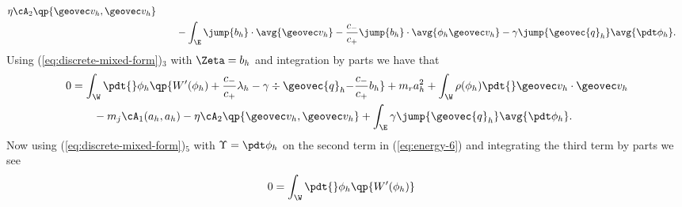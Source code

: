 \documentclass[final]{amsart}
\numberwithin{equation}{section}
\begin{document}
\begin{Proof}
\begin{equation}
\begin{split}
      \eta\cA_2\qp{{\geovec v_h},{\geovec v_h}}
      \\
      &\qquad
      -
      \int_\E
      \jump{b_h} \cdot \avg{\geovec v_h}
      -
      \frac{c_-}{c_+}\jump{b_h} \cdot \avg{\phi_h \geovec v_h}
      -
      \gamma\jump{{\geovec{q}}_h} \avg{\pdt \phi_h}.
    \end{split}
  \end{equation}
  Using (\ref{eq:discrete-mixed-form})$_3$ with $\Zeta = b_h$ and integration by parts we have
  that
\begin{equation}
    \label{eq:energy-6}
    \begin{split}
      0
      &= 
      \int_\W \pdt{}\phi_h 
      \qp{ W'(\phi_h) 
        +
        \frac{c_-}{c_+} \lambda_h 
        -
        \gamma \div{{\geovec{q}}_h}
        {-}
        \frac{c_-}{c_+} b_h
      }
      +
      m_r a_h^2
      +
      \int_\W
      \rho(\phi_h) \pdt{}\geovec v_h \cdot \geovec v_h
      \\
      &\qquad 
      - 
      m_j \cA_1(a_h,a_h) 
      -
      \eta\cA_2\qp{{\geovec v_h},{\geovec v_h}}
      +
      \int_\E
      \gamma\jump{{\geovec{q}}_h} \avg{\pdt \phi_h}.
    \end{split}
  \end{equation}
  Now using (\ref{eq:discrete-mixed-form})$_5$ with $\Upsilon = \pdt
  \phi_h$ on the second term in (\ref{eq:energy-6}) and integrating
  the third term by parts we see
  \begin{equation}
    \label{eq:energy-7}
    \begin{split}
      0
      &= 
      \int_\W \pdt{}\phi_h 
      \qp{ W'(\phi_h) 
        
}
\end{split}
\end{equation}
\end{Proof}
\end{document}
